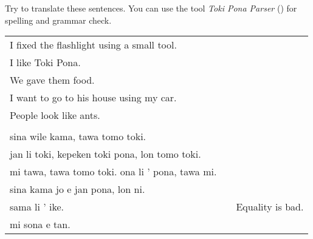 Try to translate these sentences. 
You can use the tool \textit{Toki Pona Parser} (\cite{www:rowa:02}) for spelling and grammar check. 

\begin{supertabular}{p{5,5cm}|ll}
I fixed the flashlight using a small tool.  &&  \\  %
I like Toki Pona.  &&  \\  %
We gave them food.  &&  \\ %
I want to go to his house using my car.  &&  \\  %
People look like ants. && \\ %
&& \\ %
sina wile kama, tawa tomo toki.  &&  \\ %
jan li toki, kepeken toki pona, lon tomo toki.  &&  \\ %
mi tawa, tawa tomo toki. ona li ' pona, tawa mi.  &&  \\ %
sina kama jo e jan pona, lon ni.  &&  \\ %
sama li ' ike. && Equality is bad. \\ %
mi sona e tan. &&  \\ %
\end{supertabular} 

%
